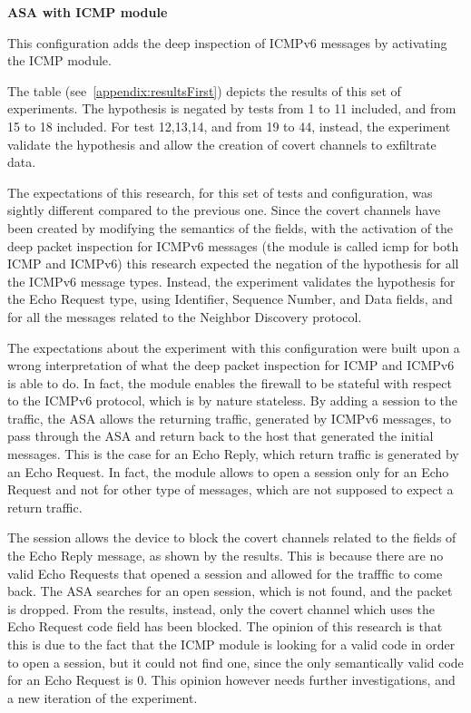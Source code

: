 \documentclass[12pt]{article}
\begin{document}
\textbf{ASA with ICMP module}
\label{resultsFirstASADefaultICMP}

This configuration adds the deep inspection of ICMPv6 messages by activating the ICMP module.

The table (see~\ref{appendix:resultsFirst}) depicts the results of this set of experiments. The hypothesis is negated by tests from 1 to 11 included, and from 15 to 18 included. For test 12,13,14, and from 19 to 44, instead, the experiment validate the hypothesis and allow the creation of covert channels to exfiltrate data.

The expectations of this research, for this set of tests and configuration, was sightly different compared to the previous one. Since the covert channels have been created by modifying the semantics of the fields, with the activation of the deep packet inspection for ICMPv6 messages (the module is called icmp for both ICMP and ICMPv6) this research expected the negation of the hypothesis for all the ICMPv6 message types. Instead, the experiment validates the hypothesis for the Echo Request type, using Identifier, Sequence Number, and Data fields, and for all the messages related to the Neighbor Discovery protocol.

The expectations about the experiment with this configuration were built upon a wrong interpretation of what the deep packet inspection for ICMP and ICMPv6 is able to do. In fact, the module enables the firewall to be stateful with respect to the ICMPv6 protocol, which is by nature stateless. By adding a session to the traffic, the ASA allows the returning traffic, generated by ICMPv6 messages, to pass through the ASA and return back to the host that generated the initial messages. This is the case for an Echo Reply, which return traffic is generated by an Echo Request. In fact, the module allows to open a session only for an Echo Request and not for other type of messages, which are not supposed to expect a return traffic.

The session allows the device to block the covert channels related to the fields of the Echo Reply message, as shown by the results. This is because there are no valid Echo Requests that opened a session and allowed for the trafffic to come back. The ASA searches for an open session, which is not found, and the packet is dropped. From the results, instead, only the covert channel which uses the Echo Request code field has been blocked. The opinion of this research is that this is due to the fact that the ICMP module is looking for a valid code in order to open a session, but it could not find one, since the only semantically valid code for an Echo Request is 0. This opinion however needs further investigations, and a new iteration of the experiment. 
\end{document}
